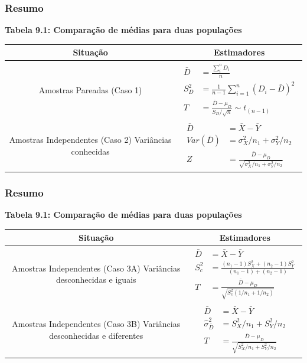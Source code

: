 \documentclass[11pt]{beamer}
\begin{document}
\begin{frame}
\frametitle{Resumo}

\textbf{Tabela 9.1: Comparação de médias para duas populações}

\begin{table}[h]
\tiny
\begin{tabular}{|c|c|}
\hline
Situação  & Estimadores  \\
\hline
Amostras Pareadas (Caso 1)  & 
\parbox{1cm}{\begin{align*}
\bar{D} &= \frac{\sum_i^nD_i}{n} \\
S^2_D &= \frac{1}{n-1}\sum_{i=1}^n(D_i-\bar{D})^2 \\
T &= \frac{\bar{D}-\mu_D}{S_D/\sqrt{n}} \sim t_{(n-1)}
\end{align*}}  \\
\hline
Amostras Independentes (Caso 2) Variâncias conhecidas  & 
\parbox{1cm}{\begin{align*}
\bar{D} &= \bar{X}-\bar{Y} \\
Var(\bar{D}) &= \sigma^2_X/n_1 + \sigma^2_Y/n_2 \\
Z &= \frac{\bar{D}-\mu_D}{\sqrt{\sigma^2_X/n_1 + \sigma^2_Y/n_2}}
\end{align*}} \\
\hline
\end{tabular}
\end{table}
\end{frame}

\begin{frame}
\frametitle{Resumo}
\textbf{Tabela 9.1: Comparação de médias para duas populações}
\begin{table}[h]
\tiny
\begin{tabular}{|c|c|}
\hline
Situação  & Estimadores  \\
\hline
Amostras Independentes (Caso 3A) Variâncias desconhecidas e iguais  &  \parbox{1cm}{\begin{align*}
\bar{D} &= \bar{X}-\bar{Y} \\
S^2_c &= \frac{(n_1-1)S^2_X+(n_2-1)S^2_Y}{(n_1-1)+(n_2-1)} \\
T &= \frac{\bar{D}-\mu_D}{\sqrt{S^2_c(1/n_1 + 1/n_2)}}
\end{align*}} \\
\hline
Amostras Independentes (Caso 3B) Variâncias desconhecidas e diferentes  & \parbox{1cm}{\begin{align*}
\bar{D} &= \bar{X}-\bar{Y} \\
\hat{\sigma}_{\bar{D}}^2 &= S^2_X/n_1+S^2_Y/n_2 \\
T &= \frac{\bar{D}-\mu_D}{\sqrt{S^2_X/n_1+S^2_Y/n_2}}
\end{align*}}  \\
\hline

\end{tabular}
\end{table}
\end{frame}
\end{document}
